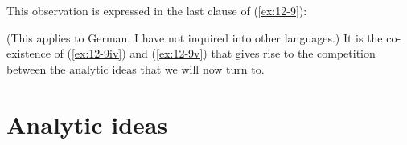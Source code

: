 \documentclass[output=paper]{langsci/langscibook}
\begin{document}
This observation is expressed in the last clause of (\ref{ex:12-9}):
\begin{exe}
\begin{xlist}
\begin{xlista}
\ex{}
\ex{}
\end{xlista}
\end{xlist}
\end{exe}
(This applies to German. I have not inquired into other languages.) It is the
co-existence of (\ref{ex:12-9iv}) and (\ref{ex:12-9v}) that gives rise to the competition between the
analytic ideas that we will now turn to.

\section{Analytic ideas}
\label{sec:12-4}
\end{document}
